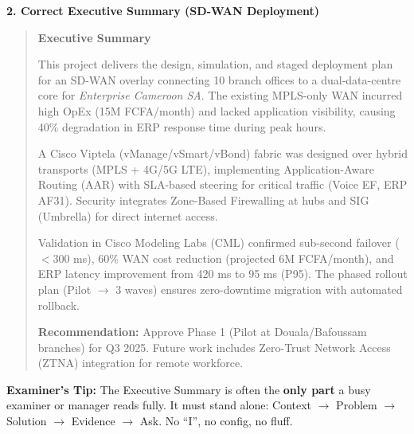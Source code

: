 \documentclass[11pt]{article}
\begin{document}
\begin{exoresolu}
\noindent\textbf{2. Correct Executive Summary (SD-WAN Deployment)}

\begin{quote}
\textbf{Executive Summary}

This project delivers the design, simulation, and staged deployment plan for an SD-WAN overlay connecting 10 branch offices to a dual-data-centre core for \textit{Enterprise Cameroon SA}. The existing MPLS-only WAN incurred high OpEx (15M FCFA/month) and lacked application visibility, causing 40\% degradation in ERP response time during peak hours.

A Cisco Viptela (vManage/vSmart/vBond) fabric was designed over hybrid transports (MPLS + 4G/5G LTE), implementing Application-Aware Routing (AAR) with SLA-based steering for critical traffic (Voice EF, ERP AF31). Security integrates Zone-Based Firewalling at hubs and SIG (Umbrella) for direct internet access.

Validation in Cisco Modeling Labs (CML) confirmed sub-second failover ($< 300$ ms), 60\% WAN cost reduction (projected 6M FCFA/month), and ERP latency improvement from 420 ms to 95 ms (P95). The phased rollout plan (Pilot $\rightarrow$ 3 waves) ensures zero-downtime migration with automated rollback.

\textbf{Recommendation:} Approve Phase 1 (Pilot at Douala/Bafoussam branches) for Q3 2025. Future work includes Zero-Trust Network Access (ZTNA) integration for remote workforce.
\end{quote}

\noindent\textbf{Examiner's Tip:} The Executive Summary is often the \textbf{only part} a busy examiner or manager reads fully. It must stand alone: Context $\rightarrow$ Problem $\rightarrow$ Solution $\rightarrow$ Evidence $\rightarrow$ Ask. No ``I'', no config, no fluff.
\end{exoresolu}
\end{document}
